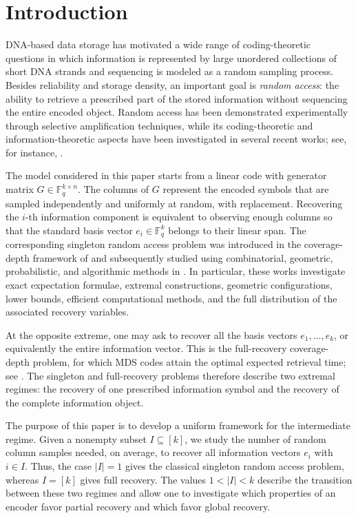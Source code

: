 \documentclass[11pt,a4paper]{article}
\numberwithin{equation}{section}
\theoremstyle{definition}
\theoremstyle{definition}
\newcommand{\F}{\mathbb{F}}
\begin{document}
\section{Introduction}

DNA-based data storage has motivated a wide range of coding-theoretic questions in which information is represented by large unordered collections of short DNA strands and sequencing is modeled as a random sampling process. Besides reliability and storage density, an important goal is \emph{random access}: the ability to retrieve a prescribed part of the stored information without sequencing the entire encoded object. Random access has been demonstrated experimentally through selective amplification techniques, while its coding-theoretic and information-theoretic aspects have been investigated in several recent works; see, for instance, \cite{organick2018random,yazdi2015dna,shomorony2022information,milenkovic2024review}.

The model considered in this paper starts from a linear code with generator matrix $G\in\F_q^{k\times n}$. The columns of $G$ represent the encoded symbols that are sampled independently and uniformly at random, with replacement. Recovering the $i$-th information component is equivalent to observing enough columns so that the standard basis vector $e_i\in\F_q^k$ belongs to their linear span. The corresponding singleton random access problem was introduced in the coverage-depth framework of \cite{bar2024cover} and subsequently studied using combinatorial, geometric, probabilistic, and algorithmic methods in \cite{gruica2024combinatorial,gruica2024geometry,boruchovsky2025making,bodur2025randomvariables,wang2026randomaccess}. In particular, these works investigate exact expectation formulae, extremal constructions, geometric configurations, lower bounds, efficient computational methods, and the full distribution of the associated recovery variables.

At the opposite extreme, one may ask to recover all the basis vectors $e_1,\ldots,e_k$, or equivalently the entire information vector. This is the full-recovery coverage-depth problem, for which MDS codes attain the optimal expected retrieval time; see \cite{bar2024cover,bertuzzo2025coverage,bertuzzo2026duality}. The singleton and full-recovery problems therefore describe two extremal regimes: the recovery of one prescribed information symbol and the recovery of the complete information object.

The purpose of this paper is to develop a uniform framework for the intermediate regime. Given a nonempty subset $I\subseteq[k]$, we study the number of random column samples needed, on average, to recover all information vectors $e_i$ with $i\in I$. Thus, the case $|I|=1$ gives the classical singleton random access problem, whereas $I=[k]$ gives full recovery. The values $1<|I|<k$ describe the transition between these two regimes and allow one to investigate which properties of an encoder favor partial recovery and which favor global recovery.
\end{document}
